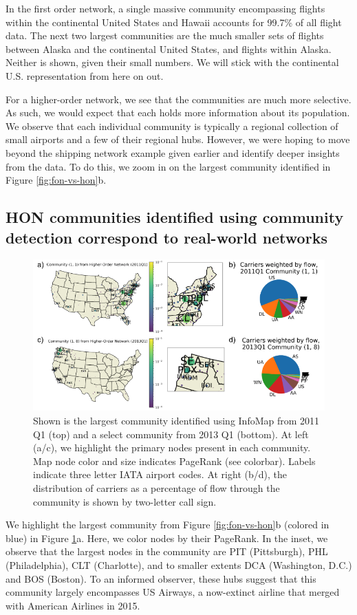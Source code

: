 \documentclass[sigconf]{acmart}
\begin{document}
In the first order network, a single massive community encompassing flights within the continental United States and Hawaii accounts for 99.7\% of all flight data. The next two largest communities are the much smaller sets of flights between Alaska and the continental United States, and flights within Alaska. Neither is shown, given their small numbers. We will stick with the continental U.S. representation from here on out.

For a higher-order network, we see that the communities are much more selective. As such, we would expect that each holds more information about its population. We observe that each individual community is typically a regional collection of small airports and a few of their regional hubs. However, we were hoping to move beyond the shipping network example given earlier and identify deeper insights from the data. To do this, we zoom in on the largest community identified in Figure \ref{fig:fon-vs-hon}b.

\subsection{HON communities identified using community detection correspond to real-world networks}
\begin{figure}
    \centering
    \includegraphics[width=\textwidth]{figs/example_community.png}
    \caption{Shown is the largest community identified using InfoMap from 2011 Q1 (top) and a select community from 2013 Q1 (bottom). At left (a/c), we highlight the primary nodes present in each community. Map node color and size indicates PageRank (see colorbar). Labels indicate three letter IATA airport codes. At right (b/d), the distribution of carriers as a percentage of flow through the community is shown by two-letter call sign.
    }
    \label{fig:community}
\end{figure}
We highlight the largest community from Figure \ref{fig:fon-vs-hon}b (colored in blue) in Figure \ref{fig:community}a. Here, we color nodes by their PageRank. In the inset, we observe that the largest nodes in the community are PIT (Pittsburgh), PHL (Philadelphia), CLT (Charlotte), and to smaller extents DCA (Washington, D.C.) and BOS (Boston). To an informed observer, these hubs suggest that this community largely encompasses US Airways, a now-extinct airline that merged with American Airlines in 2015.
\end{document}
